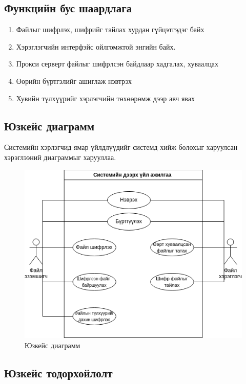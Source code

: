\subsection*{Функцийн бус шаардлага}
\begin{enumerate}
    \item Файлыг шифрлэх, шифрийг тайлах хурдан гүйцэтгэдэг байх
    \item Хэрэглэгчийн интерфэйс ойлгомжтой энгийн байх.
    \item Прокси серверт файлыг шифрлсэн байдлаар хадгалах, хуваалцах
    \item Өөрийн бүртгэлийг ашиглаж нэвтрэх
    \item Хувийн түлхүүрийг хэрлэгчийн төхөөрөмж дээр авч явах
\end{enumerate}

\subsection*{Юзкейс диаграмм}
Системийн хэрлэгчид ямар үйлдлүүдийг системд хийж болохыг харуулсан хэрэглээний диаграммыг харууллаа.
\begin{figure}[ht]
    \centering
    \includegraphics[scale=0.6]{Figures/usecase.drawio.png}
    \caption[Usecase diagram]{Юзкейс диаграмм}
    \label{fig:usecase}
\end{figure}
\subsection*{Юзкейс тодорхойлолт}

